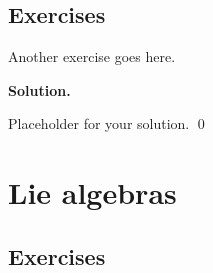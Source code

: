 \documentclass[12pt]{book}
\theoremstyle{definition}
\newenvironment{solution}
{%
  \par\noindent\textbf{Solution.}\quad
}
{%
  \qed\par
}
\begin{document}
\section{Exercises}

\begin{taggedexercise}[\textcolor{red}{TODO}]
Another exercise goes here.
\end{taggedexercise}

\begin{solution}
Placeholder for your solution.
\end{solution}

\chapter{Lie algebras}
\section{Exercises}

\begin{taggedexercise}[\textcolor{red}{TODO}]

\end{taggedexercise}

\begin{taggedexercise}[\textcolor{red}{TODO}]

\end{taggedexercise}

\begin{taggedexercise}[\textcolor{red}{TODO}]

\end{taggedexercise}

\begin{taggedexercise}[\textcolor{red}{TODO}]

\end{taggedexercise}

\begin{taggedexercise}[\textcolor{red}{TODO}]

\end{taggedexercise}

\begin{taggedexercise}[\textcolor{red}{TODO}]

\end{taggedexercise}
\end{document}
